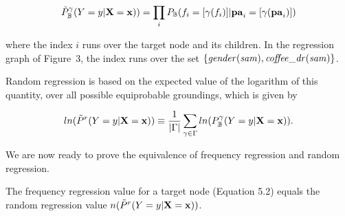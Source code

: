\documentclass[twoside,leqno,twocolumn]{article}
\begin{document}
\begin{equation} \label{eq:random-regress}
\tilde{P}_{\mathbb{B}}^{\gamma}(Y = y|\mathbf{X}=\mathbf{x}))=
\prod_{i} P_{\mathbb{B}}(f_{i} = [\gamma(f_{i})]| \mathbf{pa}_{i}=  [\gamma(\mathbf{pa}_{i})])
\end{equation}

where the index $i$ runs over the target node and its children. In the regression graph of Figure~3, the index runs over the set $\{\it{gender}(sam),\it{coffee\_{dr}(sam)}\}$.

Random regression is based on the expected value of the logarithm of this quantity,  over all possible equiprobable groundings, which is given by

\begin{equation} \label{eq:halpern-likelihood}
ln(\tilde{P}^{r}(Y = y|\mathbf{X}=\mathbf{x})) \equiv \frac{1}{|\Gamma|} \sum_{\gamma \in \Gamma} ln(P_{\mathbb{B}}^{\gamma}(Y = y|\mathbf{X}=\mathbf{x})).
\end{equation}

We are now ready to prove the equivalence of frequency regression and random regression.

\begin{theorem} \label{prop:randomize}
The frequency regression value  for a target node (Equation 5.2) equals the random regression value $n(\tilde{P}^{r}(Y = y|\mathbf{X}=\mathbf{x}))$. 
\end{theorem}
\end{document}
